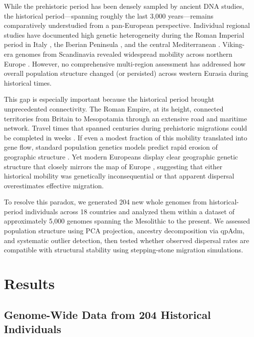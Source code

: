 \documentclass[11pt]{article}
\begin{document}
While the prehistoric period has been densely sampled by ancient DNA studies, the historical period---spanning roughly the last 3,000 years---remains comparatively understudied from a pan-European perspective. Individual regional studies have documented high genetic heterogeneity during the Roman Imperial period in Italy \citep{antonio2019ancient}, the Iberian Peninsula \citep{olalde2019genomic}, and the central Mediterranean \citep{moots2023genetic}. Viking-era genomes from Scandinavia revealed widespread mobility across northern Europe \citep{margaryan2020population}. However, no comprehensive multi-region assessment has addressed how overall population structure changed (or persisted) across western Eurasia during historical times.

This gap is especially important because the historical period brought unprecedented connectivity. The Roman Empire, at its height, connected territories from Britain to Mesopotamia through an extensive road and maritime network. Travel times that spanned centuries during prehistoric migrations could be completed in weeks \citep{scheidel2019escape, orbis}. If even a modest fraction of this mobility translated into gene flow, standard population genetics models predict rapid erosion of geographic structure \citep{kimura1964stepping, wright1943isolation}. Yet modern Europeans display clear geographic genetic structure that closely mirrors the map of Europe \citep{price2006principal}, suggesting that either historical mobility was genetically inconsequential or that apparent dispersal overestimates effective migration.

To resolve this paradox, we generated 204 new whole genomes from historical-period individuals across 18 countries and analyzed them within a dataset of approximately 5,000 genomes spanning the Mesolithic to the present. We assessed population structure using PCA projection, ancestry decomposition via qpAdm, and systematic outlier detection, then tested whether observed dispersal rates are compatible with structural stability using stepping-stone migration simulations.

\section{Results}

\subsection{Genome-Wide Data from 204 Historical Individuals}
\end{document}
